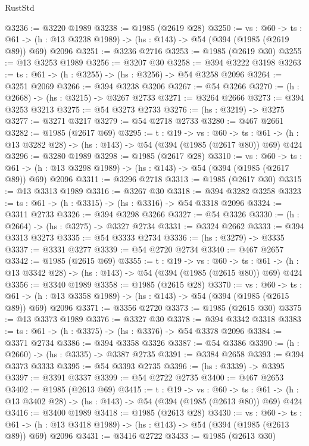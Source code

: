 \begin{lexlean}{RustStd}
\begin{coremodule}
{\begin{coremodule}
{{{{{{{{@3236 := @3220 @1989
@3238 := @1985 (@2619 @28)
@3250 := {vs : @60} ->
  {ts : @61} -> (h : @13 @3238 @1989) -> (hs : @143) -> @54 (@394 (@1985 (@2619 @89)) @69) @2096
@3251 := @3236 @2716
@3253 := @1985 (@2619 @30)
@3255 := @13 @3253 @1989
@3256 := @3207 @30
@3258 := @394 @3222 @3198
@3263 := {ts : @61} -> (h : @3255) -> (hs : @3256) -> @54 @3258 @2096
@3264 := @3251 @2069
@3266 := @394 @3238 @3206
@3267 := @54 @3266
@3270 := (h : @2668) -> (hs : @3215) -> @3267 @2733
@3271 := @3264 @2666
@3273 := @394 @3253 @3213
@3275 := @54 @3273 @2733
@3276 := (hs : @3219) -> @3275
@3277 := @3271 @3217
@3279 := @54 @2718 @2733
@3280 := @467 @2661
@3282 := @1985 (@2617 @69)
@3295 := {t : @19} ->
  {vs : @60} ->
  {ts : @61} -> (h : @13 @3282 @28) -> (hs : @143) -> @54 (@394 (@1985 (@2617 @80)) @69) @424
@3296 := @3280 @1989
@3298 := @1985 (@2617 @28)
@3310 := {vs : @60} ->
  {ts : @61} -> (h : @13 @3298 @1989) -> (hs : @143) -> @54 (@394 (@1985 (@2617 @89)) @69) @2096
@3311 := @3296 @2718
@3313 := @1985 (@2617 @30)
@3315 := @13 @3313 @1989
@3316 := @3267 @30
@3318 := @394 @3282 @3258
@3323 := {ts : @61} -> (h : @3315) -> (hs : @3316) -> @54 @3318 @2096
@3324 := @3311 @2733
@3326 := @394 @3298 @3266
@3327 := @54 @3326
@3330 := (h : @2664) -> (hs : @3275) -> @3327 @2734
@3331 := @3324 @2662
@3333 := @394 @3313 @3273
@3335 := @54 @3333 @2734
@3336 := (hs : @3279) -> @3335
@3337 := @3331 @3277
@3339 := @54 @2720 @2734
@3340 := @467 @2657
@3342 := @1985 (@2615 @69)
@3355 := {t : @19} ->
  {vs : @60} ->
  {ts : @61} -> (h : @13 @3342 @28) -> (hs : @143) -> @54 (@394 (@1985 (@2615 @80)) @69) @424
@3356 := @3340 @1989
@3358 := @1985 (@2615 @28)
@3370 := {vs : @60} ->
  {ts : @61} -> (h : @13 @3358 @1989) -> (hs : @143) -> @54 (@394 (@1985 (@2615 @89)) @69) @2096
@3371 := @3356 @2720
@3373 := @1985 (@2615 @30)
@3375 := @13 @3373 @1989
@3376 := @3327 @30
@3378 := @394 @3342 @3318
@3383 := {ts : @61} -> (h : @3375) -> (hs : @3376) -> @54 @3378 @2096
@3384 := @3371 @2734
@3386 := @394 @3358 @3326
@3387 := @54 @3386
@3390 := (h : @2660) -> (hs : @3335) -> @3387 @2735
@3391 := @3384 @2658
@3393 := @394 @3373 @3333
@3395 := @54 @3393 @2735
@3396 := (hs : @3339) -> @3395
@3397 := @3391 @3337
@3399 := @54 @2722 @2735
@3400 := @467 @2653
@3402 := @1985 (@2613 @69)
@3415 := {t : @19} ->
  {vs : @60} ->
  {ts : @61} -> (h : @13 @3402 @28) -> (hs : @143) -> @54 (@394 (@1985 (@2613 @80)) @69) @424
@3416 := @3400 @1989
@3418 := @1985 (@2613 @28)
@3430 := {vs : @60} ->
  {ts : @61} -> (h : @13 @3418 @1989) -> (hs : @143) -> @54 (@394 (@1985 (@2613 @89)) @69) @2096
@3431 := @3416 @2722
@3433 := @1985 (@2613 @30)
}}}}}}}}
\end{coremodule}}
\end{coremodule}
\end{lexlean}
